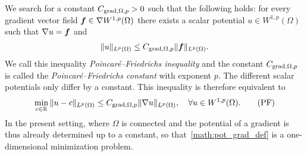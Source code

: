 \documentclass[10pt,a4paper]{article}
\begin{document}
We search for a constant $C_{\operatorname{grad},\Omega,p} > 0$ such that the following holds:
for every gradient vector field $\bm{f} \in \nabla W^{1,p}(\Omega)$ there exists a scalar potential $u \in W^{1,p}(\Omega)$
such that $\nabla u = \bm{f}$ and 
\begin{align}\label{math:intro:inequalitypf:gradient} 
    \| u \|_{L^{p}(\Omega)}
    \leq 
    C_{\operatorname{grad},\Omega,p} 
    \| \bm{f} \|_{L^{p}(\Omega)}
    .
\end{align}
We call this inequality \emph{Poincar\'e--Friedrichs inequality} and the constant $C_{\operatorname{grad},\Omega,p}$ is called the \emph{Poincar\'e--Friedrichs constant} with exponent $p$. 
The different scalar potentials only differ by a constant. 
This inequality is therefore equivalent to  
\begin{align}\label{math:intro:poincarefriedrichs:grad}
    \min\limits_{c\in{\mathbb R}}
    \| u - c \|_{L^{p}(\Omega)}
    \leq 
    C_{\operatorname{grad},\Omega,p} \| \nabla u \|_{L^{p}(\Omega)},
    \quad 
    \forall
    u \in W^{1,p}(\Omega) 
    .\tag{PF} 
\end{align}
In the present setting, where $\Omega$ is connected and the potential of a gradient is thus already determined up to a constant, so that~\eqref{math:pot_grad_def} is a one-dimensional minimization problem. 
\end{document}
